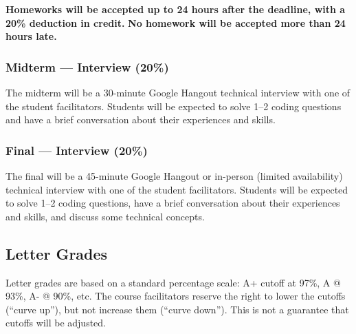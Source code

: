 \documentclass[12pt]{article}
\begin{document}
\textbf{Homeworks will be accepted up to 24 hours after the deadline, with a 20\% deduction in credit.}
\textbf{No homework will be accepted more than 24 hours late.}

\subsubsection*{Midterm --- Interview (20\%)}
The midterm will be a 30-minute Google Hangout technical interview with one of the student facilitators.
Students will be expected to solve 1--2 coding questions and have a brief conversation about their experiences and skills.

\subsubsection*{Final --- Interview (20\%)}
The final will be a 45-minute Google Hangout or in-person (limited availability) technical interview with one of the student facilitators.
Students will be expected to solve 1--2 coding questions, have a brief conversation about their experiences and skills, and discuss some technical concepts.

\subsection*{Letter Grades}
Letter grades are based on a standard percentage scale: A+ cutoff at 97\%, A @ 93\%, A- @ 90\%, etc.
The course facilitators reserve the right to lower the cutoffs (``curve up''), but not increase them (``curve down''). This is not a guarantee that cutoffs will be adjusted.

\end{document}
